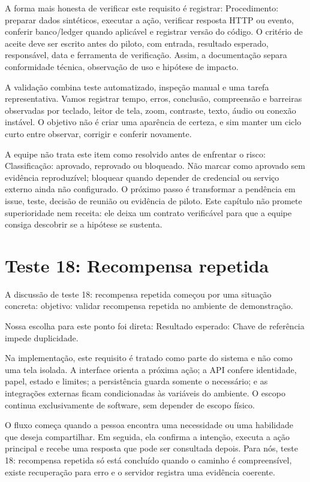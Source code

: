 \documentclass[12pt,oneside,a4paper,article]{abntex2}
\begin{document}
A forma mais honesta de verificar este requisito é registrar: Procedimento: preparar dados sintéticos, executar a ação, verificar resposta HTTP ou evento, conferir banco/ledger quando aplicável e registrar versão do código. O critério de aceite deve ser escrito antes do piloto, com entrada, resultado esperado, responsável, data e ferramenta de verificação. Assim, a documentação separa conformidade técnica, observação de uso e hipótese de impacto.

A validação combina teste automatizado, inspeção manual e uma tarefa representativa. Vamos registrar tempo, erros, conclusão, compreensão e barreiras observadas por teclado, leitor de tela, zoom, contraste, texto, áudio ou conexão instável. O objetivo não é criar uma aparência de certeza, e sim manter um ciclo curto entre observar, corrigir e conferir novamente.

A equipe não trata este item como resolvido antes de enfrentar o risco: Classificação: aprovado, reprovado ou bloqueado. Não marcar como aprovado sem evidência reproduzível; bloquear quando depender de credencial ou serviço externo ainda não configurado. O próximo passo é transformar a pendência em issue, teste, decisão de reunião ou evidência de piloto. Este capítulo não promete superioridade nem receita: ele deixa um contrato verificável para que a equipe consiga descobrir se a hipótese se sustenta.

\section{Teste 18: Recompensa repetida}
A discussão de teste 18: recompensa repetida começou por uma situação concreta: objetivo: validar recompensa repetida no ambiente de demonstração.

Nossa escolha para este ponto foi direta: Resultado esperado: Chave de referência impede duplicidade.

Na implementação, este requisito é tratado como parte do sistema e não como uma tela isolada. A interface orienta a próxima ação; a API confere identidade, papel, estado e limites; a persistência guarda somente o necessário; e as integrações externas ficam condicionadas às variáveis do ambiente. O escopo continua exclusivamente de software, sem depender de escopo físico.

O fluxo começa quando a pessoa encontra uma necessidade ou uma habilidade que deseja compartilhar. Em seguida, ela confirma a intenção, executa a ação principal e recebe uma resposta que pode ser consultada depois. Para nós, teste 18: recompensa repetida só está concluído quando o caminho é compreensível, existe recuperação para erro e o servidor registra uma evidência coerente.
\end{document}
